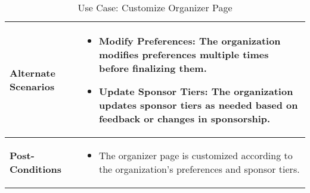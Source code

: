 \begin{table}[!ht]
\begin{tabularx}{\textwidth}{|l|X|}
        \hline
        \textbf{Alternate Scenarios} & 
        \begin{itemize}[label=--,itemsep=0pt]
            \item Modify Preferences: The organization modifies preferences multiple times before finalizing them.
            \item Update Sponsor Tiers: The organization updates sponsor tiers as needed based on feedback or changes in sponsorship.
        \end{itemize} \\
        \hline
        \textbf{Post-Conditions} & 
        \begin{itemize}[label=--,itemsep=0pt]
            \item The organizer page is customized according to the organization’s preferences and sponsor tiers.
        \end{itemize} \\
        \hline
    \end{tabularx}
    \caption{Use Case: Customize Organizer Page}
    \label{tab:use-case-customize-organizer-page}
\end{table}


